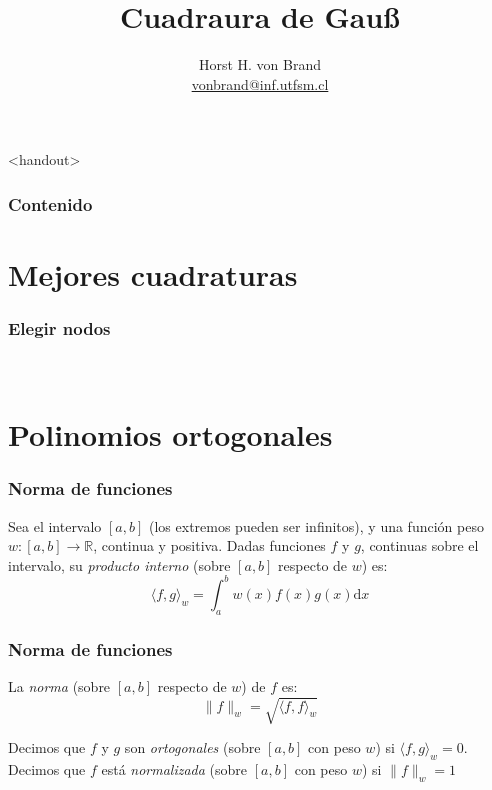 \documentclass[english, spanish, fleqn,%
hyperref = {colorlinks, urlcolor = blue}%
]{beamer}
\title{Cuadraura de Gauß}
\author[Horst H. von Brand]{Horst H. von Brand\\
  \href{mailto:vonbrand@inf.utfsm.cl}{vonbrand@inf.utfsm.cl}}
\institute[DI UTFSM]{Departamento de Informática\\
                     Universidad Técnica Federico Santa María}
\date{}
\begin{document}
\frame{\maketitle}

\begin{frame}<handout>
  \frametitle{Contenido}

  \tableofcontents
\end{frame}

\section{Mejores cuadraturas}

\begin{frame}
  \setcounter{beamerpauses}{2}
  \frametitle{Elegir nodos}

  \\ \medskip
\end{frame}

\section{Polinomios ortogonales}

\begin{frame}
  \frametitle{Norma de funciones}

  \begin{definition}
    Sea el intervalo \([a, b]\)
    (los extremos pueden ser infinitos),
    y una función peso \(w \colon [a, b] \to \mathbb{R}\),
    continua y positiva.
    Dadas funciones \(f\) y \(g\),
    continuas sobre el intervalo,
    su \emph{producto interno}
    (sobre \([a, b]\) respecto de \(w\)) es:
    \begin{equation*}
      \langle f, g \rangle_w
        = \int_a^b w(x) f(x) g(x) \mathrm{d} x
    \end{equation*}
  \end{definition}
\end{frame}

\begin{frame}
  \frametitle{Norma de funciones}

  \begin{definition}[cont]
    La \emph{norma}
    (sobre \([a, b]\) respecto de \(w\)) de \(f\) es:
    \begin{equation*}
      \lVert f \rVert_w
        = \sqrt{\langle f, f \rangle_w}
    \end{equation*}

    Decimos que \(f\) y \(g\) son \emph{ortogonales}
    (sobre \([a, b]\) con peso \(w\))
    si \(\langle f, g \rangle_w = 0\).
    Decimos que \(f\) está \emph{normalizada}
    (sobre \([a, b]\) con peso \(w\))
    si \(\lVert f \rVert_w = 1\)
  \end{definition}
\end{frame}
\end{document}
